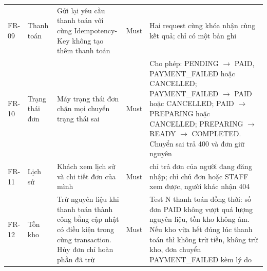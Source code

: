 {\begin{longtable}{@{}L{1.2cm}L{1.6cm}L{4.9cm}L{1.3cm}L{4.9cm}@{}}
FR-09 & Thanh toán & Gửi lại yêu cầu thanh toán với cùng Idempotency-Key không tạo thêm thanh toán & Must & Hai request cùng khóa nhận cùng kết quả; chỉ có một bản ghi  \\
FR-10 & Trạng thái đơn & Máy trạng thái đơn chặn mọi chuyển trạng thái sai & Must & Cho phép: PENDING $\rightarrow$ PAID, PAYMENT\_FAILED hoặc CANCELLED; PAYMENT\_FAILED $\rightarrow$ PAID hoặc CANCELLED; PAID $\rightarrow$ PREPARING hoặc CANCELLED; PREPARING $\rightarrow$ READY $\rightarrow$ COMPLETED. Chuyển sai trả 400 và đơn giữ nguyên \\
FR-11 & Lịch sử & Khách xem lịch sử và chi tiết đơn của mình & Must &  chỉ trả đơn của người đang đăng nhập;  chỉ chủ đơn hoặc STAFF xem được, người khác nhận 404 \\
FR-12 & Tồn kho & Trừ nguyên liệu khi thanh toán thành công bằng cập nhật có điều kiện trong cùng transaction. Hủy đơn chỉ hoàn phần đã trừ & Must & Test N thanh toán đồng thời: số đơn PAID không vượt quá lượng nguyên liệu, tồn kho không âm. Nếu kho vừa hết đúng lúc thanh toán thì không trừ tiền, không trừ kho, đơn chuyển PAYMENT\_FAILED kèm lý do \\
\end{longtable}
}